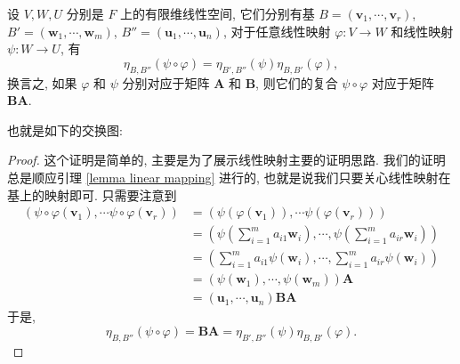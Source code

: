 \documentclass[UTF8]{book}
\begin{document}
\begin{theorem}
    设 $V, W, U$ 分别是 $F$ 上的有限维线性空间, 
    它们分别有基 
    $B=(\boldsymbol{v}_1,\cdots,\boldsymbol{v}_r)$, 
    $B'=(\boldsymbol{w}_1,\cdots,\boldsymbol{w}_m)$, 
    $B''=(\boldsymbol{u}_1,\cdots,\boldsymbol{u}_n)$, 
    对于任意线性映射 $\varphi: V \to W$ 和线性映射 
    $\psi: W \to U$, 
    有 
    $$ \eta_{B,B''}(\psi \circ \varphi) =
    \eta_{B',B''}(\psi)  \eta_{B,B'}(\varphi), $$
    换言之, 如果 $\varphi$ 和 $\psi$ 分别对应于矩阵 
    $\boldsymbol{A}$ 和 $\boldsymbol{B}$, 
    则它们的复合 $\psi \circ \varphi$ 对应于矩阵 $\boldsymbol{BA}$. 

    也就是如下的交换图: 
    \begin{center}
    \end{center}
\end{theorem}

\begin{proof}
    这个证明是简单的, 主要是为了展示线性映射主要的证明思路. 
    我们的证明总是顺应引理 \ref{lemma linear mapping} 进行的, 
    也就是说我们只要关心线性映射在基上的映射即可. 
    只需要注意到
    $$ \begin{aligned}
    (\psi \circ \varphi(\boldsymbol{v}_1),\cdots 
    \psi \circ \varphi(\boldsymbol{v}_r) ) 
    &= (\psi (\varphi(\boldsymbol{v}_1)),\cdots 
    \psi(\varphi(\boldsymbol{v}_r)) ) \\
    &= \left(\psi\left(\sum\limits_{i=1}^{m}a_{i1}
    \boldsymbol{w}_i\right),\cdots,
    \psi\left(\sum\limits_{i=1}^{m}a_{ir}
    \boldsymbol{w}_i\right) \right) \\
    &= \left(\sum\limits_{i=1}^{m}a_{i1}\psi\left(
    \boldsymbol{w}_i\right),\cdots,
    \sum\limits_{i=1}^{m}a_{ir}\psi\left(
    \boldsymbol{w}_i\right) \right) \\
    &= (\psi(\boldsymbol{w}_1),\cdots,\psi(\boldsymbol{w}_m))
    \boldsymbol{A}\\
    &= (\boldsymbol{u}_1,\cdots,\boldsymbol{u}_n)\boldsymbol{BA}
    \end{aligned}$$
    于是, 
    $$\eta_{B,B''}(\psi \circ \varphi) = \boldsymbol{BA} 
    = \eta_{B',B''}(\psi)  \eta_{B,B'}(\varphi).$$
\end{proof}
\end{document}
